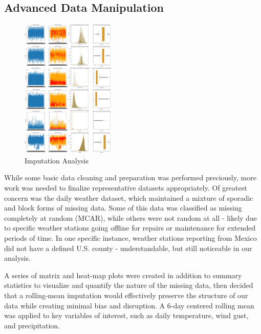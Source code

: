 \documentclass{article}
\begin{document}
\subsection{Advanced Data Manipulation}
\begin{figure}
  \vspace{-10pt} %
  \centering
  \includegraphics[width=0.4\textwidth]{Final_Report/images/Missing_Values_Imputation.png}
  \centering
  \caption{Imputation Analysis }
  \label{sec:Imputation Analysis}
  \vspace{-2pt} %
\end{figure}
\hspace{.5cm}While some basic data cleaning and preparation was performed preciously, more work was needed to finalize representative datasets appropriately. Of greatest concern was the daily weather dataset, which maintained a mixture of sporadic and block forms of missing data. Some of this data was classified as missing completely at random (MCAR), while others were not random at all - likely due to specific weather stations going offline for repairs or maintenance for extended periods of time. In one specific instance, weather stations reporting from Mexico did not have a defined U.S. county - understandable, but still noticeable in our analysis.

A series of matrix and heat-map plots were created in addition to summary statistics to visualize and quantify the nature of the missing data, then decided that a rolling-mean imputation would effectively preserve the structure of our data while creating minimal bias and disruption. A 6-day centered rolling mean was applied to key variables of interest, such as daily temperature, wind gust, and precipitation.
\end{document}
